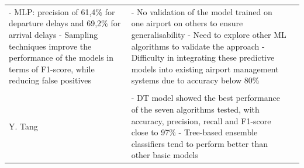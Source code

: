 \documentclass[12pt,oneside]{book} %
\begin{document}
\begin{longtable}{>{\raggedright\arraybackslash}p{2.5cm} p{7.3cm} >{\raggedright\arraybackslash}p{7.3cm}}
\newline - MLP: precision of 61,4\% for departure delays and 69,2\% for arrival delays
\newline - Sampling techniques improve the performance of the models in terms of F1-score, while reducing false positives 
& - No validation of the model trained on one airport on others to ensure generalisability 
\newline -  Need to explore other ML algorithms to validate the approach
\newline - Difficulty in integrating these predictive models into existing airport management systems due to accuracy below 80\%
\\
& & 
\\
Y. Tang \cite{Tang}
& - DT model showed the best performance of the seven algorithms tested, with accuracy, precision, recall and F1-score close to 97\%
\newline - Tree-based ensemble classifiers tend to perform better than other basic models


\end{longtable}
\end{document}
